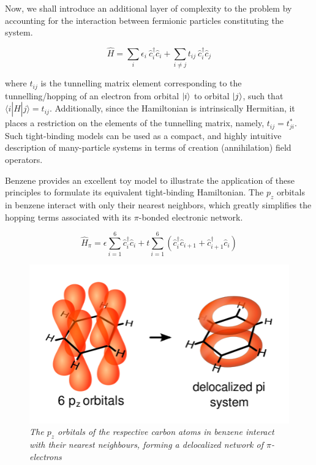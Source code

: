 Now, we shall introduce an additional layer of complexity to the problem by accounting for the interaction between fermionic particles constituting the system.

\begin{equation}
    \hat{H} = \sum_{i}\epsilon_{i} \: \hat{c}_{i}^{\dagger} \hat{c}_{i} + \sum_{i \neq j}t_{ij} \: \hat{c}_{i}^{\dagger} \hat{c}_{j}
\end{equation}

where $t_{ij}$ is the tunnelling matrix element corresponding to the tunnelling/hopping of an electron from orbital $\ket{i}$ to orbital $\ket{j}$, such that $\langle i|\hat{H}|j \rangle = t_{ij}$. Additionally, since the Hamiltonian is intrinsically Hermitian, it places a restriction on the elements of the tunnelling matrix, namely, $t_{ij} = t_{ji}^{*}$. Such tight-binding models can be used as a compact, and highly intuitive description of many-particle systems in terms of creation (annihilation) field operators. \par

Benzene provides an excellent toy model to illustrate the application of these principles to formulate its equivalent tight-binding Hamiltonian. The $p_{z}$ orbitals in benzene interact with only their nearest neighbors, which greatly simplifies the hopping terms associated with its $\pi$-bonded electronic network. 

\begin{equation*}
    \hat{H}_{\pi} = \epsilon \sum_{i=1}^{6} \hat{c}_{i}^{\dagger} \hat{c}_{i} + t \sum_{i=1}^{6} (\hat{c}_{i}^{\dagger} \hat{c}_{i+1} + \hat{c}_{i+1}^{\dagger} \hat{c}_{i})
\end{equation*}

\vspace{1cm}

\begin{figure}[h]
\centering
\includegraphics[scale=0.7]{benzene.png}
\caption{\textit{The $p_{z}$ orbitals of the respective carbon atoms in benzene interact with their nearest neighbours, forming a delocalized network of $\pi$-electrons}}\label{benzene}
\end{figure}